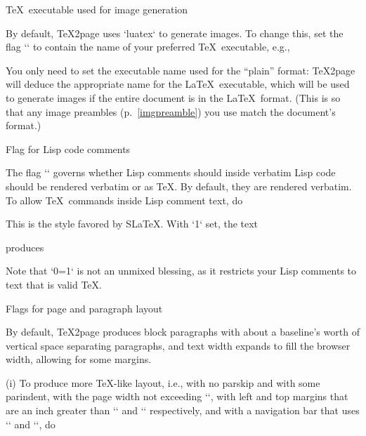 \beginsection \TeX\ executable used for image generation

By default, \TeX2page uses `luatex` to
generate images. To change this, set the flag `\TZPtexprogname` to
contain the name of your preferred \TeX\ executable, e.g.,

\begintt
\def\TZPtexprogname{xetex}
\endtt
%
You only need to set the executable name used for the “plain” format:
\TeX2page will deduce the appropriate name for the \LaTeX\ executable,
which will be used to generate images if the entire document is in the
\LaTeX\ format.  (This is so that any image preambles
(p.~\ref{imgpreamble}) you use match the
document’s format.)

\beginsection Flag for Lisp code comments

The flag `\TZPslatexcomments` governs whether Lisp comments
should inside verbatim Lisp code should be rendered verbatim or as \TeX.
By default, they are rendered verbatim.   To allow \TeX\ commands inside
Lisp comment text, do

\begintt
\let\TZPslatexcomments=1
\endtt
%
This is the style favored by S\LaTeX.
\ifx\shipout\UnDeFiNeD
With `\TZPslatexcomments` set, the text

\begintt
{}
\endtt
%
produces
\let\TZPslatexcomments 1

\let\TZPslatexcomments 0

\fi
Note that `\TZPslatexcomments=1` is not an unmixed blessing, as it
restricts your Lisp comments to text that is valid \TeX.

\beginsection Flags for page and paragraph layout

%
By default, \TeX2page produces block paragraphs with about a
baseline’s worth of vertical space separating paragraphs, and text width
expands to fill the browser width, allowing for some margins.

(i) To produce more \TeX-like layout, i.e., with no parskip and
with some parindent,
with the page width not exceeding `\hsize`,
with left and top margins that are an inch greater than
`\hoffset` and `\voffset` respectively, and with a
navigation bar that uses `\headline` and `\footline`,
do

\begintt
\let\TZPtexlayout=1
\endtt


